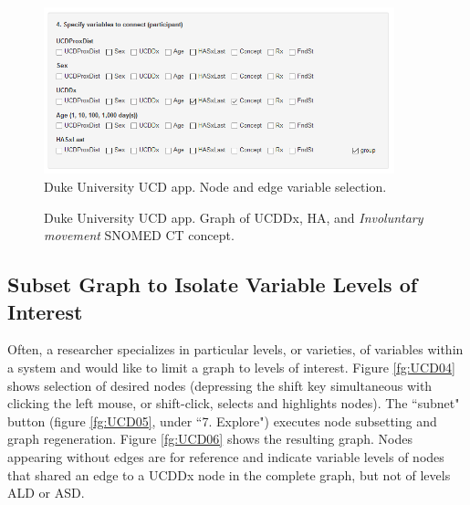 \documentclass[10pt, letterpaper]{article}
\begin{document}
\begin{spacing}{1.0}
\begin{figure}[H]
    \includegraphics[width=4in]{UCD02.png}
    \centering
    \caption{Duke University UCD app.  Node and edge variable selection.}
    \label{fg:UCD02}
\end{figure}

\begin{figure}[H]
    \centering
    \caption{Duke University UCD app.  Graph of UCDDx, HA, and \textit{Involuntary movement} SNOMED CT concept.}
    \label{fg:UCD03}
\end{figure}

\subsection{Subset Graph to Isolate Variable Levels of Interest}

Often, a researcher specializes in particular levels, or varieties, of variables within a system and would like to limit a graph to levels of interest.  Figure \ref{fg:UCD04} shows selection of desired nodes (depressing the shift key simultaneous with clicking the left mouse, or shift-click, selects and highlights nodes).  The ``subnet" button (figure \ref{fg:UCD05}, under ``7. Explore") executes node subsetting and graph regeneration.  Figure \ref{fg:UCD06} shows the resulting graph.  Nodes appearing without edges are for reference and indicate variable levels of nodes that shared an edge to a UCDDx node in the complete graph, but not of levels ALD or ASD.\\


\end{spacing}
\end{document}
